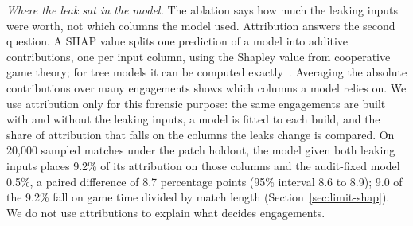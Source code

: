 \emph{Where the leak sat in the model.} The ablation says how much the leaking inputs were worth, not
which columns the model used. Attribution answers the second question. A SHAP value splits one prediction
of a model into additive contributions, one per input column, using the Shapley value from cooperative
game theory; for tree models it can be computed exactly~\cite{lundberg2020local}. Averaging the absolute
contributions over many engagements shows which columns a model relies on. We use attribution only for
this forensic purpose: the same engagements are built with and without the leaking inputs, a model is
fitted to each build, and the share of attribution that falls on the columns the leaks change is compared.
On 20,000 sampled matches under the patch holdout, the model given both leaking inputs places 9.2\% of
its attribution on those columns and the audit-fixed model 0.5\%, a paired difference of 8.7 percentage
points (95\% interval 8.6 to 8.9); 9.0 of the 9.2\% fall on game time divided by match length
(Section~\ref{sec:limit-shap}). We do not use attributions to explain what decides engagements.

